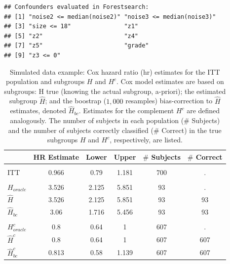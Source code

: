 \documentclass[smallextended]{svjour3}
\makeatletter
\newenvironment{kframe}{%
 \def\at@end@of@kframe{}%
 \ifinner\ifhmode%
  \def\at@end@of@kframe{\end{minipage}}%
  \begin{minipage}{\columnwidth}%
 \fi\fi%
 \def\FrameCommand##1{\hskip\@totalleftmargin \hskip-\fboxsep
 \colorbox{shadecolor}{##1}\hskip-\fboxsep
     \hskip-\linewidth \hskip-\@totalleftmargin \hskip\columnwidth}%
 \MakeFramed {\advance\hsize-\width
   \@totalleftmargin\z@ \linewidth\hsize
   \@setminipage}}%
 {\par\unskip\endMakeFramed%
 \at@end@of@kframe}
\newenvironment{knitrout}{}{} %
\makeatother
\begin{document}
\begin{knitrout}
\color{fgcolor}\begin{kframe}
\begin{verbatim}
## Confounders evaluated in Forestsearch:
## [1] "noise2 <= median(noise2)" "noise3 <= median(noise3)"
## [3] "size <= 18"               "z1"                      
## [5] "z2"                       "z4"                      
## [7] "z5"                       "grade"                   
## [9] "z3 <= 0"
\end{verbatim}
\end{kframe}
\end{knitrout}





\begin{table}

\caption{\label{tab:simex_tab}\label{tab:simex} Simulated data example: Cox hazard ratio (hr) estimates for the ITT population and subgroups $H$ and $H^{c}$.
Cox model estimates are based on subgroups: H true (knowing the actual subgroup, a-priori); the estimated subgroup $\hat{H}$; and 
the boostrap ($1,000$ resamples) bias-correction to $\hat{H}$ estimates, denoted $\hat{H}_{bc}$.  Estimates for the complement $H^{c}$ are defined analogously.
The number of subjects in each population ($\#$ Subjects) and the number of subjects correctly classified ($\#$ Correct) in the true subgroups $H$ and $H^{c}$, respectively, are listed.}
\centering
\fontsize{9}{11}\selectfont
\begin{tabular}[t]{lccccc}
\toprule
  & HR Estimate & Lower & Upper & $\#$ Subjects & $\#$ Correct\\
\midrule
\addlinespace[0.3em]
\multicolumn{6}{l}{\textbf{ITT}}\\
\hspace{1em}ITT & 0.966 & 0.79 & 1.181 & 700 & .\\
\addlinespace[0.3em]
\multicolumn{6}{l}{\textbf{H subgroup estimates}}\\
\hspace{1em}$H_{oracle}$ & 3.526 & 2.125 & 5.851 & 93 & .\\
\hspace{1em}$\hat{H}$ & 3.526 & 2.125 & 5.851 & 93 & 93\\
\hspace{1em}$\hat{H}_{bc}$ & 3.06 & 1.716 & 5.456 & 93 & 93\\
\addlinespace[0.3em]
\multicolumn{6}{l}{\textbf{H-complement subgroup estimates}}\\
\hspace{1em}$H^{c}_{oracle}$ & 0.8 & 0.64 & 1 & 607 & .\\
\hspace{1em}$\hat{H}^{c}$ & 0.8 & 0.64 & 1 & 607 & 607\\
\hspace{1em}$\hat{H}^{c}_{bc}$ & 0.813 & 0.58 & 1.139 & 607 & 607\\
\bottomrule
\end{tabular}
\end{table}





\end{document}
